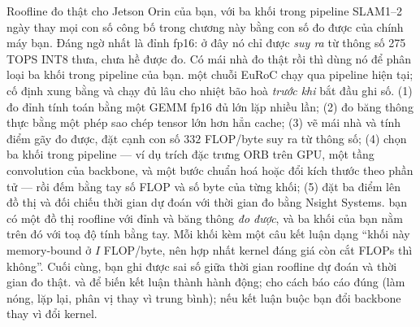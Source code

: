 \documentclass[../../deep_learning.tex]{subfiles}
\begin{document}
\begin{ungdung}
\end{ungdung}

\begin{duan}{Roofline đo thật cho Jetson Orin của bạn, với ba khối trong pipeline SLAM}{1--2 ngày}
\dmt thay mọi con số công bố trong chương này bằng con số đo được của chính máy bạn. Đáng ngờ nhất là đỉnh fp16: ở đây nó chỉ được \emph{suy ra} từ thông số 275 TOPS INT8 thưa, chưa hề được đo. Có mái nhà đo thật rồi thì dùng nó để phân loại ba khối trong pipeline của bạn.
\ddl một chuỗi EuRoC chạy qua pipeline hiện tại; cố định xung bằng  và chạy đủ lâu cho nhiệt bão hoà \emph{trước khi} bắt đầu ghi số.
\dbc (1) đo đỉnh tính toán bằng một GEMM fp16 đủ lớn lặp nhiều lần; (2) đo băng thông thực bằng một phép sao chép tensor lớn hơn hẳn cache; (3) vẽ mái nhà và tính điểm gãy đo được, đặt cạnh con số \(332\) FLOP/byte suy ra từ thông số; (4) chọn ba khối trong pipeline --- ví dụ trích đặc trưng ORB trên GPU, một tầng convolution của backbone, và một bước chuẩn hoá hoặc đổi kích thước theo phần tử --- rồi đếm bằng tay số FLOP và số byte của từng khối; (5) đặt ba điểm lên đồ thị và đối chiếu thời gian dự đoán với thời gian đo bằng Nsight Systems.
\dxk bạn có một đồ thị roofline với đỉnh và băng thông \emph{đo được}, và ba khối của bạn nằm trên đó với toạ độ tính bằng tay. Mỗi khối kèm một câu kết luận dạng ``khối này memory-bound ở \(I\) FLOP/byte, nên hợp nhất kernel đáng giá còn cắt FLOPs thì không''. Cuối cùng, bạn ghi được sai số giữa thời gian roofline dự đoán và thời gian đo thật.
\dnv {} và  để biến kết luận thành hành động;  cho cách báo cáo đúng (làm nóng, lặp lại, phân vị thay vì trung bình);  nếu kết luận buộc bạn đổi backbone thay vì đổi kernel.
\end{duan}
\end{document}
